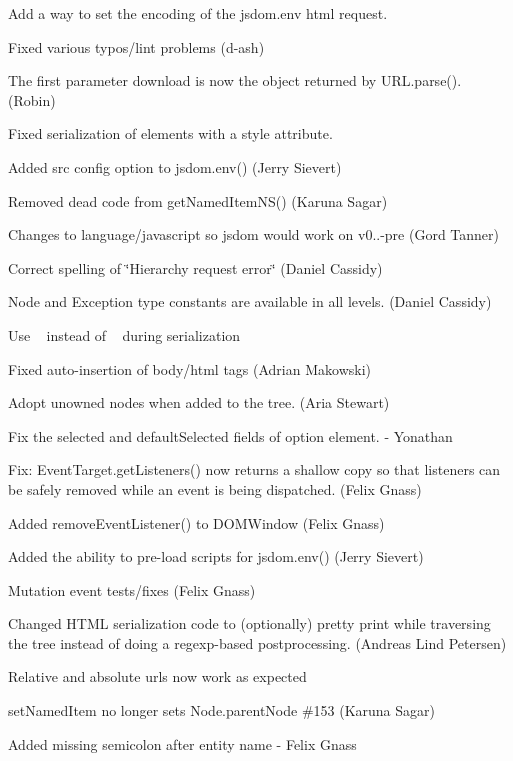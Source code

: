 \begin{DoxyItemize}
\item Add a way to set the encoding of the jsdom.\+env html request.
\item Fixed various typos/lint problems (d-\/ash)
\item The first parameter download is now the object returned by U\+R\+L.\+parse(). (Robin)
\item Fixed serialization of elements with a style attribute.
\item Added src config option to jsdom.\+env() (Jerry Sievert)
\item Removed dead code from get\+Named\+Item\+N\+S() (Karuna Sagar)
\item Changes to language/javascript so jsdom would work on v0..-\/pre (Gord Tanner)
\item Correct spelling of \char`\"{}\+Hierarchy request error\char`\"{} (Daniel Cassidy)
\item Node and Exception type constants are available in all levels. (Daniel Cassidy)
\item Use ~\newline
 instead of ~\newline
 during serialization
\item Fixed auto-\/insertion of body/html tags (Adrian Makowski)
\item Adopt unowned nodes when added to the tree. (Aria Stewart)
\item Fix the selected and default\+Selected fields of {\ttfamily option} element. -\/ Yonathan
\item Fix\+: Event\+Target.\+get\+Listeners() now returns a shallow copy so that listeners can be safely removed while an event is being dispatched. (Felix Gnass)
\item Added remove\+Event\+Listener() to D\+O\+M\+Window (Felix Gnass)
\item Added the ability to pre-\/load scripts for jsdom.\+env() (Jerry Sievert)
\item Mutation event tests/fixes (Felix Gnass)
\item Changed H\+T\+ML serialization code to (optionally) pretty print while traversing the tree instead of doing a regexp-\/based postprocessing. (Andreas Lind Petersen)
\item Relative and absolute urls now work as expected
\item set\+Named\+Item no longer sets Node.\+parent\+Node \#153 (Karuna Sagar)
\item Added missing semicolon after entity name -\/ Felix Gnass

\end{DoxyItemize}
